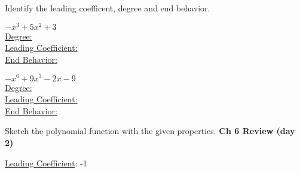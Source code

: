 \documentclass{report}
\theoremstyle{definition}
\begin{document}
\begin{enumerate}
		\vspace{4cm}
	
	
\hspace{-2cm}  Identify the leading coefficent, degree and end behavior.
	
	\begin{minipage}[t]{0.45\linewidth}
		\item $-x^3+5x^2+3$\\
		
		\vspace{0.5cm}
		\underline{Degree:}\\
		
		\vspace{0.5cm}
		\underline{Leading Coefficient:}\\

		\vspace{0.5cm}
		\underline{End Behavior:}
	\end{minipage}
	\hfill
	\begin{minipage}[t]{0.45\linewidth}
		\item $-x^6+9x^3-2x-9$\\
		
		\vspace{0.5cm}
		\underline{Degree:}\\
		
		\vspace{0.5cm}
		\underline{Leading Coefficient:}\\
		
		\vspace{0.5cm}
		\underline{End Behavior:}
	\end{minipage}


	
\vspace{2cm}


 \newpage


\hspace{-2cm}\noindent Sketch the polynomial function with the given properties. \hfill \textbf{Ch 6 Review (day 2)}\\ \normalsize


\begin{minipage}[t]{0.45\linewidth}
\item
\small
	\begin{minipage}[t]{0.45\linewidth}
		\underline{Leading Coefficient}: -1\\
		

\end{minipage}
\end{minipage}
\end{enumerate}
\end{document}
